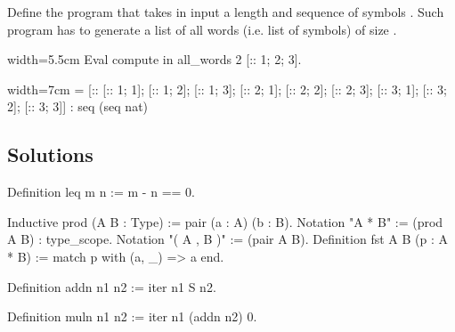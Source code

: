 \begin{Exercise}[label=ex:allwords,difficulty=2,title={All words of size n}]
Define the  program that takes in input a
length  and sequence of symbols .
Such program has to generate a list of all words (i.e. list
of symbols) of size .

\begin{coq}{}{width=5.5cm}
Eval compute in
  all_words 2 [:: 1; 2; 3].
\end{coq}
\begin{coqout}{}{width=7cm}
 = [:: [:: 1; 1]; [:: 1; 2]; [:: 1; 3];
       [:: 2; 1]; [:: 2; 2]; [:: 2; 3];
       [:: 3; 1]; [:: 3; 2]; [:: 3; 3]]
 : seq (seq nat)
\end{coqout}
\end{Exercise}

\subsection{Solutions}

\begin{Answer}[ref=ex:leq]

\begin{coq}{}{}
Definition leq m n := m - n == 0.
\end{coq}

\end{Answer}

\begin{Answer}[ref=ex:pair]

\begin{coq}{}{}
Inductive prod (A B : Type) := pair (a : A) (b : B).
Notation "A * B" := (prod A B) : type_scope.
Notation "( A , B )" := (pair A B).
Definition fst A B (p : A * B) :=
  match p with (a, _) => a end.
\end{coq}

\end{Answer}

\begin{Answer}[ref=ex:iteradd]

\begin{coq}{}{}
Definition addn n1 n2 := iter n1 S n2.
\end{coq}

\end{Answer}

\begin{Answer}[ref=ex:itermul]

\begin{coq}{}{}
Definition muln n1 n2 := iter n1 (addn n2) 0.
\end{coq}

\end{Answer}

